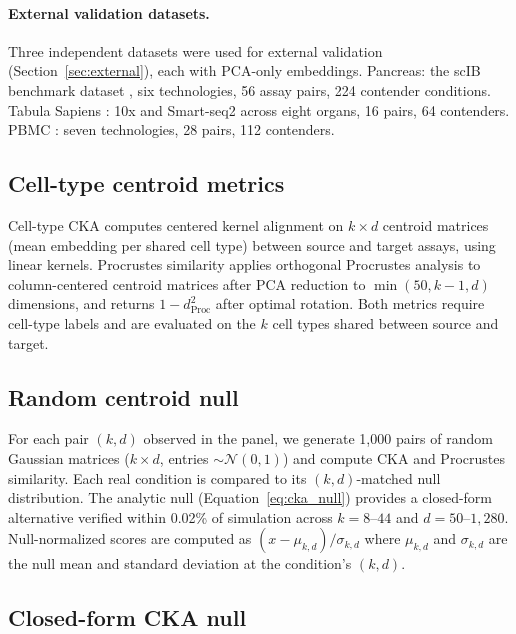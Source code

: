 \documentclass[11pt]{article}
\begin{document}
\paragraph{External validation datasets.} Three independent datasets
were used for external validation (Section~\ref{sec:external}), each
with PCA-only embeddings. Pancreas: the scIB benchmark dataset
\citep{luecken2022scib}, six technologies, 56 assay pairs, 224
contender conditions. Tabula Sapiens \citep{tabulasapiens2022}: 10x and
Smart-seq2 across eight organs, 16 pairs, 64 contenders. PBMC
\citep{ding2020systematic}: seven technologies, 28 pairs, 112
contenders.

\subsection{Cell-type centroid metrics}

Cell-type CKA \citep{kornblith2019similarity} computes centered kernel
alignment on $k \times d$ centroid matrices (mean embedding per shared
cell type) between source and target assays, using linear kernels.
Procrustes similarity applies orthogonal Procrustes analysis to
column-centered centroid matrices after PCA reduction to $\min(50,
k-1, d)$ dimensions, and returns $1 - d_{\mathrm{Proc}}^2$ after
optimal rotation. Both metrics require cell-type labels and are
evaluated on the $k$ cell types shared between source and target.

\subsection{Random centroid null}

For each pair $(k, d)$ observed in the panel, we generate 1,000 pairs
of random Gaussian matrices ($k \times d$, entries $\sim
\mathcal{N}(0,1)$) and compute CKA and Procrustes similarity. Each real
condition is compared to its $(k, d)$-matched null distribution. The
analytic null (Equation~\ref{eq:cka_null}) provides a closed-form
alternative verified within 0.02\% of simulation across $k = 8$--$44$
and $d = 50$--$1{,}280$. Null-normalized scores are computed as
$(x - \mu_{k,d}) / \sigma_{k,d}$ where $\mu_{k,d}$ and $\sigma_{k,d}$
are the null mean and standard deviation at the condition's $(k, d)$.

\subsection{Closed-form CKA null}
\label{sec:closedform}
\end{document}
